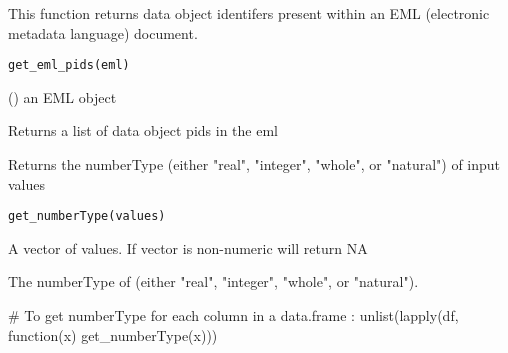 \documentclass[letterpaper]{book}
\begin{document}
%
\begin{Description}\relax
This function returns data object identifers present within an EML (electronic
metadata language) document.
\end{Description}
%
\begin{Usage}
\begin{verbatim}
get_eml_pids(eml)
\end{verbatim}
\end{Usage}
%
\begin{Arguments}
\begin{ldescription}
\item[\code{eml}] () an EML object
\end{ldescription}
\end{Arguments}
%
\begin{Value}
Returns a list of data object pids in the eml
\end{Value}
%
\begin{Description}\relax
Returns the numberType (either "real", "integer", "whole", or "natural") of input values
\end{Description}
%
\begin{Usage}
\begin{verbatim}
get_numberType(values)
\end{verbatim}
\end{Usage}
%
\begin{Arguments}
\begin{ldescription}
\item[\code{values}] A vector of values. If vector is non-numeric will return NA
\end{ldescription}
\end{Arguments}
%
\begin{Value}
The numberType of  (either "real", "integer", "whole", or "natural").
\end{Value}
%
\begin{Examples}
\begin{ExampleCode}
# To get numberType for each column in a data.frame :
unlist(lapply(df, function(x) get_numberType(x)))
\end{ExampleCode}
\end{Examples}
\end{document}
